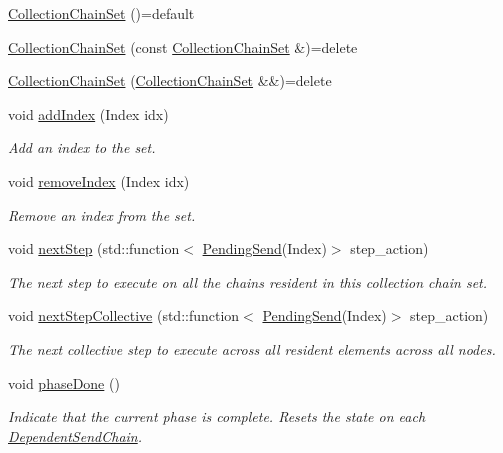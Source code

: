 \begin{DoxyCompactItemize}
\item 
\hyperlink{classvt_1_1messaging_1_1_collection_chain_set_aeb43ad4a2e46ea059817b639b72ddb3b}{Collection\+Chain\+Set} ()=default
\item 
\hyperlink{classvt_1_1messaging_1_1_collection_chain_set_a71328cb5c03210ffdb0bd5dd5f3b6797}{Collection\+Chain\+Set} (const \hyperlink{classvt_1_1messaging_1_1_collection_chain_set}{Collection\+Chain\+Set} \&)=delete
\item 
\hyperlink{classvt_1_1messaging_1_1_collection_chain_set_a21be566436c86fa59a02a1bd073a9e48}{Collection\+Chain\+Set} (\hyperlink{classvt_1_1messaging_1_1_collection_chain_set}{Collection\+Chain\+Set} \&\&)=delete
\item 
void \hyperlink{classvt_1_1messaging_1_1_collection_chain_set_aefc11c9b011b4916c3b80dfc8f776239}{add\+Index} (Index idx)
\begin{DoxyCompactList}\small\item\em Add an index to the set. \end{DoxyCompactList}\item 
void \hyperlink{classvt_1_1messaging_1_1_collection_chain_set_a299e52c482aba47bcdabe796d236c043}{remove\+Index} (Index idx)
\begin{DoxyCompactList}\small\item\em Remove an index from the set. \end{DoxyCompactList}\item 
void \hyperlink{classvt_1_1messaging_1_1_collection_chain_set_aa4e8a0a24fa7cde6e7f729f4dd002e64}{next\+Step} (std\+::function$<$ \hyperlink{structvt_1_1messaging_1_1_pending_send}{Pending\+Send}(Index)$>$ step\+\_\+action)
\begin{DoxyCompactList}\small\item\em The next step to execute on all the chains resident in this collection chain set. \end{DoxyCompactList}\item 
void \hyperlink{classvt_1_1messaging_1_1_collection_chain_set_a7d226984e696278b9ca7e539c974bab4}{next\+Step\+Collective} (std\+::function$<$ \hyperlink{structvt_1_1messaging_1_1_pending_send}{Pending\+Send}(Index)$>$ step\+\_\+action)
\begin{DoxyCompactList}\small\item\em The next collective step to execute across all resident elements across all nodes. \end{DoxyCompactList}\item 
void \hyperlink{classvt_1_1messaging_1_1_collection_chain_set_afcb749b22063068d060f35fdcd2320b3}{phase\+Done} ()
\begin{DoxyCompactList}\small\item\em Indicate that the current phase is complete. Resets the state on each {\ttfamily \hyperlink{classvt_1_1messaging_1_1_dependent_send_chain}{Dependent\+Send\+Chain}}. \end{DoxyCompactList}\end{DoxyCompactItemize}


